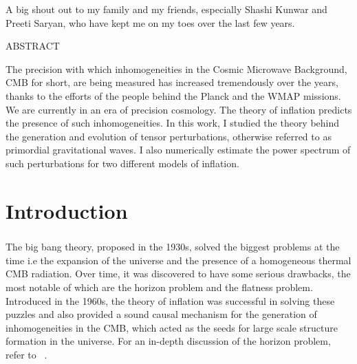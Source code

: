 \documentclass[12pt,a4paper,oneside]{book}
\begin{document}
A big shout out to my family and my friends, especially Shashi Kunwar
and Preeti Saryan, who have kept me on my toes over the last few years.
 

\newpage\topskip 40pt
\thispagestyle{empty}
\centerline{\Large ABSTRACT}
\vskip 20pt\noindent 

The precision with which inhomogeneities in the Cosmic Microwave Background, CMB for short, are being measured
has increased tremendously over the years, thanks to the efforts of the people behind the Planck and the WMAP 
missions. We are currently in an era of precision cosmology. The theory of inflation predicts the presence of such 
inhomogeneities. In this work, I studied the theory behind the generation and evolution of tensor perturbations, 
otherwise referred to as primordial gravitational waves. I also numerically estimate the power spectrum of such 
perturbations for two different models of inflation.

\newpage
\thispagestyle{empty}
\tableofcontents
\newpage


\newpage
\thispagestyle{empty}
\listoffigures
\newpage




\chapter{Introduction}

\paragraph*{} The big bang theory, proposed in the 1930s, solved the biggest problems at the time i.e the expansion of the universe and 
the presence of a homogeneous thermal CMB radiation. Over time, it was discovered to have some serious drawbacks, the most notable 
of which are the horizon problem and the flatness problem. Introduced in the 1960s, the theory of inflation was successful in solving 
these puzzles and also provided a sound causal mechanism for the generation of inhomogeneities in the CMB, which acted as the seeds 
for large scale structure formation in the universe. For an in-depth discussion of the horizon problem, refer to ~\cite{Sriramkumar L - 2009}.
\end{document}
